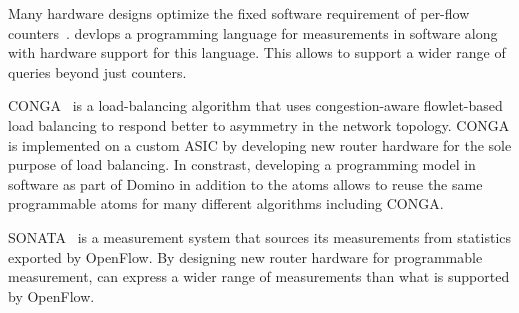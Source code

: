  Many hardware designs optimize the fixed
software requirement of per-flow counters~\cite{sundar_counters, lrt}.
\TheSystem devlops a programming language for measurements in software along
with hardware support for this language. This allows \TheSystem to support a
wider range of queries beyond just counters.

 CONGA~\cite{conga} is a load-balancing algorithm that uses
congestion-aware flowlet-based load balancing to respond better to asymmetry in
the network topology. CONGA is implemented on a custom ASIC by developing new
router hardware for the sole purpose of load balancing. In constrast,
developing a programming model in software as part of Domino in addition to the
atoms allows to reuse the same programmable atoms for many different algorithms
including CONGA.

 SONATA~\cite{sonata} is a measurement system that sources its
measurements from statistics exported by OpenFlow. By designing new router
hardware for programmable measurement, \TheSystem can express a wider range of
measurements than what is supported by OpenFlow.
